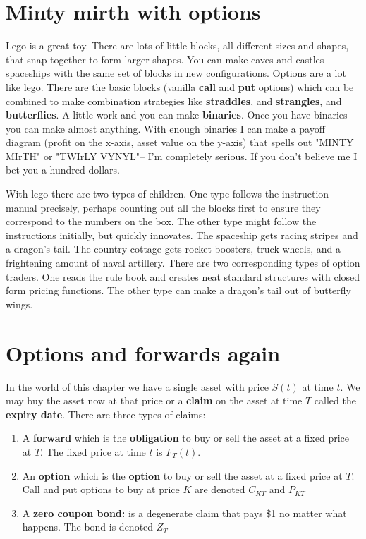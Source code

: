 

\section{Minty mirth with options} 

Lego is a great toy. There are lots of little blocks, all different sizes and shapes, that snap together to form larger shapes. You can make caves and castles spaceships with the same set of blocks in new configurations. Options are a lot like lego. There are the basic blocks (vanilla \textbf{call} and \textbf{put} options) which can be combined to make combination strategies like \textbf{straddles}, and \textbf{strangles}, and \textbf{butterflies}. A little work and you can make \textbf{binaries}. Once you have binaries you can make almost anything. With enough binaries I can make a payoff diagram (profit on the x-axis, asset value on the y-axis) that spells out "MINTY MIrTH"  or "TWIrLY VYNYL"-- I'm completely serious. If you don't believe me I bet you a hundred dollars.  

With lego there are two types of children. One type follows the instruction manual precisely, perhaps counting out all the blocks first to ensure they correspond to the numbers on the box.  The other type might follow the instructions initially, but quickly innovates. The spaceship gets racing stripes and a dragon's tail. The country cottage gets rocket boosters, truck wheels, and a frightening amount of naval artillery. There are two corresponding types of option traders. One reads the rule book and creates neat standard structures with closed form pricing functions. The other type can make a dragon's tail out of butterfly wings. 

\section{Options and forwards again}

In the world of this chapter we have a single asset with price $S(t)$ at time $t$. We may buy the asset now at that price or a \textbf{claim} on the asset at time $T$ called the \textbf{expiry date}. There are three types of claims:

\begin{enumerate}
\item A \textbf{forward} which is the \textbf{obligation} to buy or sell the asset at a fixed price at $T$. The fixed price at time $t$ is $F_T(t)$. 
\item An \textbf{option} which is the \textbf{option} to buy or sell the asset at a fixed price at $T$. Call and put options to buy at price $K$ are denoted $C_{KT}$ and $P_{KT}$
\item A \textbf{zero coupon bond:} is a degenerate claim that pays \$1 no matter what happens. The bond is denoted $Z_T$
\end{enumerate}

